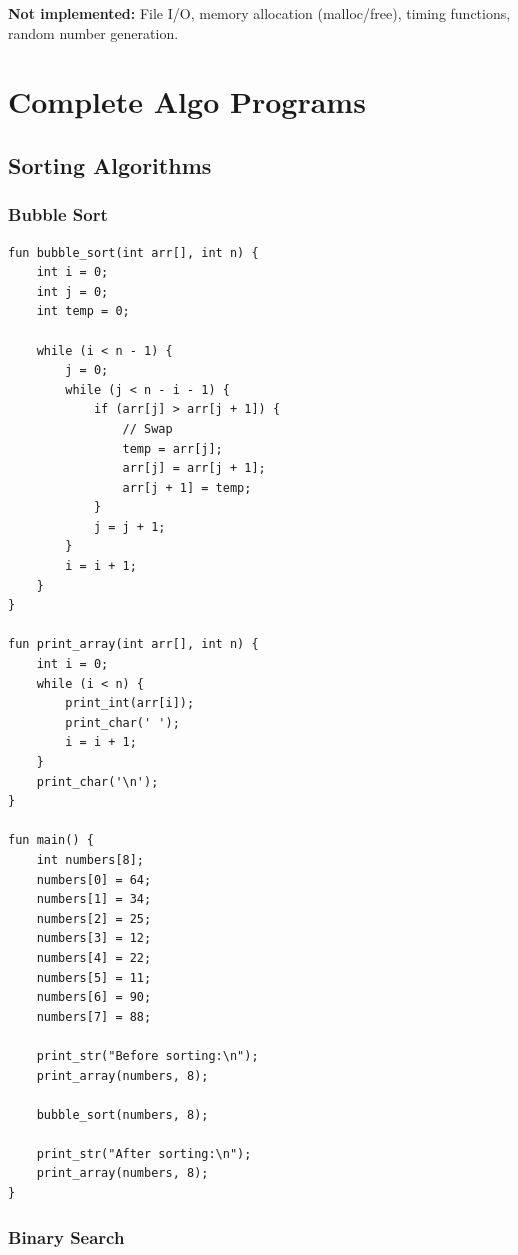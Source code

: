 \documentclass[12pt,a4paper,oneside]{book}
\begin{document}
\textbf{Not implemented:} File I/O, memory allocation (malloc/free), timing functions, random number generation.

\chapter{Complete Algo Programs}

\section{Sorting Algorithms}

\subsection{Bubble Sort}

\begin{lstlisting}[style=algo, caption={Bubble Sort Implementation}]
fun bubble_sort(int arr[], int n) {
    int i = 0;
    int j = 0;
    int temp = 0;
    
    while (i < n - 1) {
        j = 0;
        while (j < n - i - 1) {
            if (arr[j] > arr[j + 1]) {
                // Swap
                temp = arr[j];
                arr[j] = arr[j + 1];
                arr[j + 1] = temp;
            }
            j = j + 1;
        }
        i = i + 1;
    }
}

fun print_array(int arr[], int n) {
    int i = 0;
    while (i < n) {
        print_int(arr[i]);
        print_char(' ');
        i = i + 1;
    }
    print_char('\n');
}

fun main() {
    int numbers[8];
    numbers[0] = 64;
    numbers[1] = 34;
    numbers[2] = 25;
    numbers[3] = 12;
    numbers[4] = 22;
    numbers[5] = 11;
    numbers[6] = 90;
    numbers[7] = 88;
    
    print_str("Before sorting:\n");
    print_array(numbers, 8);
    
    bubble_sort(numbers, 8);
    
    print_str("After sorting:\n");
    print_array(numbers, 8);
}
\end{lstlisting}

\subsection{Binary Search}
\end{document}
